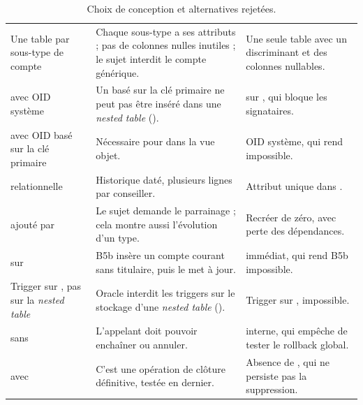\begin{table}[htbp]
  \centering
  \small
  \caption{Choix de conception et alternatives rejetées.}
  \label{tab:choix-a-defendre}
  \begin{tabularx}{\textwidth}{@{}L{3.8cm}X L{4.1cm}@{}}
    \toprule
     &  &  \\
    \midrule
    Une table par sous-type de compte &
    Chaque sous-type a ses attributs ; pas de colonnes nulles inutiles ; le
    sujet interdit le compte générique. &
    Une seule table  avec un discriminant et des colonnes
    nullables. \\
     avec OID système &
    Un  basé sur la clé primaire ne peut pas être inséré dans une
    \emph{nested table} (). &
     sur , qui bloque les
    signataires. \\
     avec OID basé sur la clé primaire &
    Nécessaire pour  dans la vue objet. &
    OID système, qui rend  impossible. \\
     relationnelle &
    Historique daté, plusieurs lignes par conseiller. &
    Attribut  unique dans . \\
     ajouté par  &
    Le sujet demande le parrainage ; cela montre aussi l'évolution d'un type. &
    Recréer  de zéro, avec perte des dépendances. \\
     sur  &
    B5b insère un compte courant sans titulaire, puis le met à jour. &
     immédiat, qui rend B5b impossible. \\
    Trigger sur , pas sur la \emph{nested table} &
    Oracle interdit les triggers sur le stockage d'une \emph{nested table}
    (). &
    Trigger sur , impossible. \\
     sans  &
    L'appelant doit pouvoir enchaîner ou annuler. &
     interne, qui empêche de tester le rollback global. \\
     avec  &
    C'est une opération de clôture définitive, testée en dernier. &
    Absence de , qui ne persiste pas la suppression. \\
    \bottomrule
  \end{tabularx}
\end{table}

